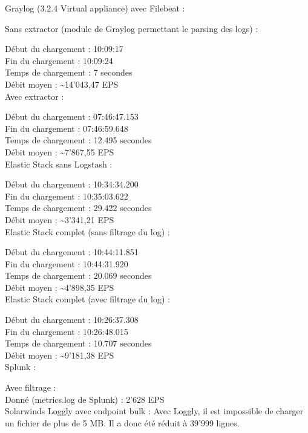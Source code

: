 \documentclass[paper=a4, fontsize=11pt]{scrartcl}
\begin{document}
Graylog (3.2.4 Virtual appliance) avec Filebeat :

Sans extractor (module de Graylog permettant le parsing des logs) :

Début du chargement : 10:09:17 \\
Fin du chargement : 10:09:24 \\
Temps de chargement : 7 secondes \\
Débit moyen : \textasciitilde 14'043,47 EPS \\

Avec extractor :

Début du chargement : 07:46:47.153 \\
Fin du chargement : 07:46:59.648 \\
Temps de chargement : 12.495 secondes \\
Débit moyen : \textasciitilde 7'867,55 EPS \\

Elastic Stack sans Logstash :

Début du chargement : 10:34:34.200 \\
Fin du chargement : 10:35:03.622 \\
Temps de chargement : 29.422 secondes \\
Débit moyen : \textasciitilde 3'341,21 EPS \\

Elastic Stack complet (sans filtrage du log) :

Début du chargement : 10:44:11.851 \\
Fin du chargement : 10:44:31.920 \\
Temps de chargement : 20.069 secondes \\
Débit moyen : \textasciitilde 4'898,35 EPS \\

Elastic Stack complet (avec filtrage du log) :

Début du chargement : 10:26:37.308 \\
Fin du chargement : 10:26:48.015 \\
Temps de chargement : 10.707 secondes \\
Débit moyen : \textasciitilde 9'181,38 EPS \\

Splunk :

Avec filtrage : \\
Donné (metrics.log de Splunk) : 2'628 EPS \\

Solarwinds Loggly avec endpoint bulk :
Avec Loggly, il est impossible de charger un fichier de plus de 5 MB. Il a donc été réduit à 39'999 lignes.
\end{document}
